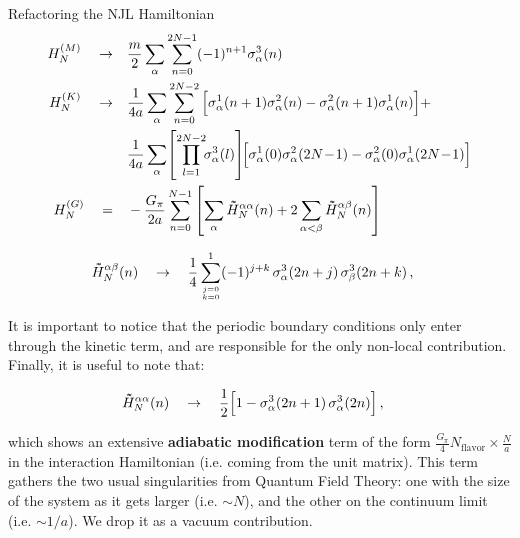 \begin{frame}[allowframebreaks]{Refactoring the NJL Hamiltonian}
  \begin{align*}
    H_{N}^{(M)} \qra&
      \frac{m}{2} \sum_\alpha \sum_{n=0}^{2N-1}
      (-1)^{n+1}\sigma_\alpha^{3}(n) \\
    H_{N}^{(K)} \qra&
      \frac{1}{4a} \sum_\alpha \sum_{n=0}^{2N-2}
      \qty[
        \sigma_\alpha^{1}(n+1) \sigma_\alpha^{2}(n) -
        \sigma_\alpha^{2}(n+1) \sigma_\alpha^{1}(n)
      ] + \nonumber\\&
      \frac{1}{4a} \sum_\alpha \!
      \qty[\prod_{l=1}^{2N-2} \!\! \sigma_\alpha^3(l)] \!
      \qty[
        \sigma_\alpha^{1}(0) \sigma_\alpha^{2}(2N \!-\! 1) -
        \sigma_\alpha^{2}(0) \sigma_\alpha^{1}(2N \!-\! 1)
      ] \\
    H_{N}^{(G)} \quad=\quad& - \frac{G_{\pi}}{2a} \sum_{n=0}^{N-1} \qty[
      \sum_{\alpha} \dbtilde{H}_{N}^{\alpha\alpha}(n) + 2
      \sum_{\alpha < \beta} \dbtilde{H}_{N}^{\alpha\beta}(n)] %
  \end{align*}

\break

  \begin{gather*}
    \dbtilde{H}_{N}^{\alpha\beta}(n) \qra
      \frac{1}{4} \sum_{{j=0}\atop{k=0}}^{1}
      (-1)^{j+k} \, \sigma_\alpha^{3}(2n+j) \, \sigma_\beta^{3}(2n+k) \qc
  \end{gather*}

  It is important to notice that the periodic boundary conditions only enter through the kinetic term, and are responsible for the only non-local contribution. Finally, it is useful to note that:

  \begin{gather*}
    \dbtilde{H}_{N}^{\alpha\alpha}(n) \qra
      \frac{1}{2} \qty[1 - \sigma_\alpha^{3}(2n+1) \, \sigma_\alpha^{3}(2n)] \qc
  \end{gather*}

  which shows an extensive \textbf{adiabatic modification} term of the form $\frac{G_\pi}{4} N_\text{flavor} \times \frac{N}{a}$ in the interaction Hamiltonian (i.e. coming from the unit matrix). This term gathers the two usual singularities from Quantum Field Theory: one with the size of the system as it gets larger (i.e. $\sim N$), and the other on the continuum limit (i.e. $\sim 1/a$). We drop it as a vacuum contribution.

\end{frame}
